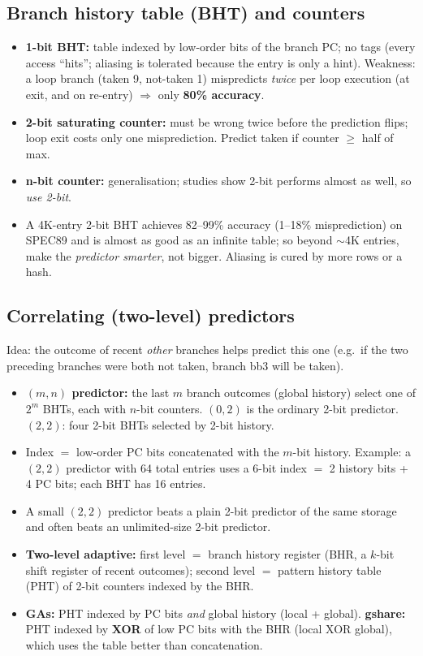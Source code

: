 \subsection{Branch history table (BHT) and counters}
\begin{itemize}
\item \textbf{1-bit BHT:} table indexed by low-order bits of the branch PC; no tags (every access ``hits''; aliasing is tolerated because the entry is only a hint). Weakness: a loop branch (taken 9, not-taken 1) mispredicts \emph{twice} per loop execution (at exit, and on re-entry) $\Rightarrow$ only \textbf{80\% accuracy}.
\item \textbf{2-bit saturating counter:} must be wrong twice before the prediction flips; loop exit costs only one misprediction. Predict taken if counter $\ge$ half of max.
\item \textbf{n-bit counter:} generalisation; studies show 2-bit performs almost as well, so \emph{use 2-bit}.
\item A 4K-entry 2-bit BHT achieves 82--99\% accuracy (1--18\% misprediction) on SPEC89 and is almost as good as an infinite table; so beyond $\sim$4K entries, make the \emph{predictor smarter}, not bigger. Aliasing is cured by more rows or a hash.
\end{itemize}

\subsection{Correlating (two-level) predictors}
Idea: the outcome of recent \emph{other} branches helps predict this one (e.g.\ if the two preceding branches were both not taken, branch bb3 will be taken).
\begin{itemize}
\item \textbf{$(m,n)$ predictor:} the last $m$ branch outcomes (global history) select one of $2^m$ BHTs, each with $n$-bit counters. $(0,2)$ is the ordinary 2-bit predictor. $(2,2)$: four 2-bit BHTs selected by 2-bit history.
\item Index $=$ low-order PC bits concatenated with the $m$-bit history. Example: a $(2,2)$ predictor with 64 total entries uses a 6-bit index $=$ 2 history bits + 4 PC bits; each BHT has 16 entries.
\item A small $(2,2)$ predictor beats a plain 2-bit predictor of the same storage and often beats an unlimited-size 2-bit predictor.
\item \textbf{Two-level adaptive:} first level $=$ branch history register (BHR, a $k$-bit shift register of recent outcomes); second level $=$ pattern history table (PHT) of 2-bit counters indexed by the BHR.
\item \textbf{GAs:} PHT indexed by PC bits \emph{and} global history (local + global). \textbf{gshare:} PHT indexed by \textbf{XOR} of low PC bits with the BHR (local XOR global), which uses the table better than concatenation\bs.
\end{itemize}

